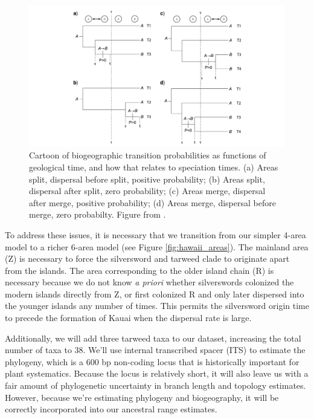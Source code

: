 \begin{figure}[!ht]
\centering
\includegraphics[width=\textwidth]{figures/fig_biogeo_dating.png}
\caption{Cartoon of biogeographic transition probabilities as functions of geological time, and how that relates to speciation times. (a) Areas split, dispersal before split, positive probability; (b) Areas split, dispersal after split, zero probability; (c) Areas merge, dispersal after merge, positive probability; (d) Areas merge, dispersal before merge, zero probabilty. Figure from \citet{Landis2016}.}
\label{fig:biogeo_dating_cartoon}
\end{figure}

To address these issues, it is necessary that we transition from our simpler 4-area model to a richer 6-area model (see Figure \ref{fig:hawaii_areas}).
The mainland area (Z) is necessary to force the silversword and tarweed clade to originate apart from the islands.
The area corresponding to the older island chain (R) is necessary because we do not know {\it a priori} whether silverswords colonized the modern islands directly from Z, or first colonized R and only later dispersed into the younger islands any number of times.
This permits the silversword origin time to precede the formation of Kauai when the dispersal rate is large.

Additionally, we will add three tarweed taxa to our dataset, increasing the total number of taxa to 38.
We'll use internal transcribed spacer (ITS) to estimate the phylogeny, which is a 600 bp non-coding locus that is historically important for plant systematics.
Because the locus is relatively short, it will also leave us with a fair amount of phylogenetic uncertainty in branch length and topology estimates.
However, because we're estimating phylogeny and biogeography, it will be correctly incorporated into our ancestral range estimates.

